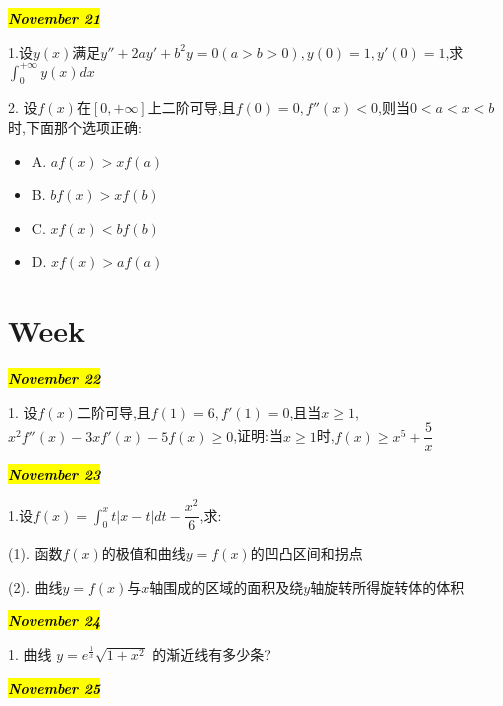 \hl{\textbf{\textit{November 21}}}

1.设$y(x)$满足$y''+2ay'+b^{2}y=0(a>b>0),y(0)=1,y'(0)=1$,求$\int_{0}^{+\infty}y(x)dx$
\begin{solution}
	
\end{solution}

2. 设$f(x)$在$[0,+\infty]$上二阶可导,且$f(0)=0,f''(x)<0$,则当$0<a<x<b$时,下面那个选项正确:
\begin{itemize}
	\item A. $af(x)>xf(a)$
	\item B. $bf(x)>xf(b)$
	\item C. $xf(x)<bf(b)$
	\item D. $xf(x)>af(a)$
\end{itemize}
\begin{solution}
	
\end{solution}

\section{Week }
\hl{\textbf{\textit{November 22}}}

1. 设$f(x)$二阶可导,且$f(1)=6,f'(1)=0$,且当$x\geq 1$,$x^{2}f''(x)-3xf'(x)-5f(x)\geq 0$,证明:当$x\geq 1$时,$f(x)\geq x^{5}+\dfrac{5}{x}$
\begin{solution}
	
\end{solution}

\hl{\textbf{\textit{November 23}}}

1.设$f(x)=\int_{0}^{x}t|x-t|dt-\dfrac{x^{2}}{6}$,求:

(1). 函数$f(x)$的极值和曲线$y=f(x)$的凹凸区间和拐点

(2). 曲线$y=f(x)$与$x$轴围成的区域的面积及绕$y$轴旋转所得旋转体的体积
\begin{solution}
	
\end{solution}

\hl{\textbf{\textit{November 24}}}

1. 曲线 $y=e^{\frac{1}{x}}\sqrt{1+x^{2}}$ 的渐近线有多少条?
\begin{solution}
	
\end{solution}

\hl{\textbf{\textit{November 25}}}

